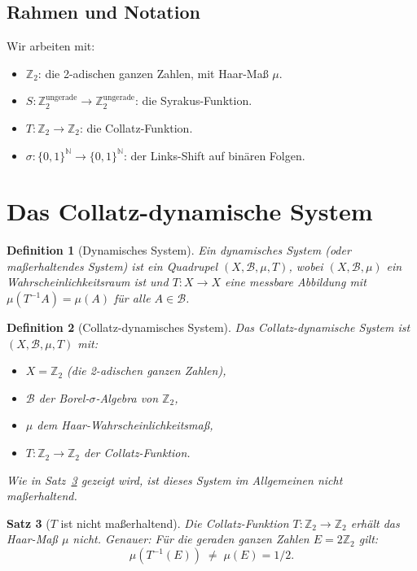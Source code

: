 \documentclass[12pt,a4paper]{article}
\newtheorem{theorem}{Satz}[section]
\newtheorem{definition}[theorem]{Definition}
\begin{document}
\subsection{Rahmen und Notation}

Wir arbeiten mit:
\begin{itemize}
  \item $\mathbb{Z}_2$: die 2-adischen ganzen Zahlen, mit Haar-Maß $\mu$.
  \item $S\colon \mathbb{Z}_2^{\text{ungerade}} \to \mathbb{Z}_2^{\text{ungerade}}$: die Syrakus-Funktion.
  \item $T\colon \mathbb{Z}_2 \to \mathbb{Z}_2$: die Collatz-Funktion.
  \item $\sigma\colon \{0,1\}^\mathbb{N} \to \{0,1\}^\mathbb{N}$: der Links-Shift auf binären Folgen.
\end{itemize}

\section{Das Collatz-dynamische System}

\begin{definition}[Dynamisches System]\label{def:dynsys}
Ein \emph{dynamisches System} (oder maßerhaltendes System) ist ein Quadrupel
$(X, \mathcal{B}, \mu, T)$, wobei $(X, \mathcal{B}, \mu)$ ein Wahrscheinlichkeitsraum
ist und $T\colon X \to X$ eine messbare Abbildung mit $\mu(T^{-1}A) = \mu(A)$ für alle
$A \in \mathcal{B}$.
\end{definition}

\begin{definition}[Collatz-dynamisches System]\label{def:collatz_ds}
Das \emph{Collatz-dynamische System} ist $(X, \mathcal{B}, \mu, T)$ mit:
\begin{itemize}
  \item $X = \mathbb{Z}_2$ (die 2-adischen ganzen Zahlen),
  \item $\mathcal{B}$ der Borel-$\sigma$-Algebra von $\mathbb{Z}_2$,
  \item $\mu$ dem Haar-Wahrscheinlichkeitsmaß,
  \item $T\colon \mathbb{Z}_2 \to \mathbb{Z}_2$ der Collatz-Funktion.
\end{itemize}
Wie in Satz~\ref{thm:nicht_masserhaltend} gezeigt wird, ist dieses System im Allgemeinen
\emph{nicht} maßerhaltend.
\end{definition}

\begin{theorem}[$T$ ist nicht maßerhaltend]\label{thm:nicht_masserhaltend}
Die Collatz-Funktion $T\colon \mathbb{Z}_2 \to \mathbb{Z}_2$ erhält das Haar-Maß $\mu$
nicht. Genauer: Für die geraden ganzen Zahlen $E = 2\mathbb{Z}_2$ gilt:
\[
  \mu(T^{-1}(E)) \;\neq\; \mu(E) = 1/2.
\]
\end{theorem}
\end{document}
